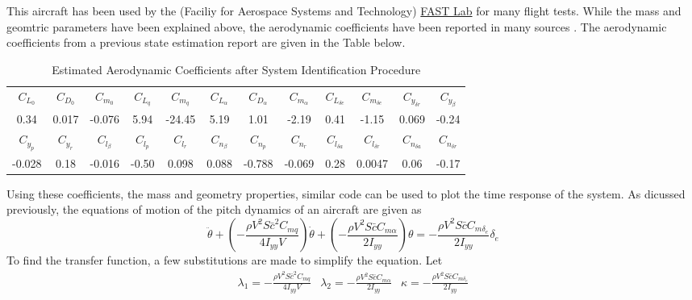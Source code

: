 This aircraft has been used by the (Faciliy for Aerospace Systems and Technology) \href{http://www.aerialsystems.org/}{FAST Lab} for many flight tests. While the mass and geomtric parameters have been explained above, the aerodynamic coefficients have been reported in many sources \cite{Cobar_FASTSim_AVIATION_2022,CobarMeta2019,CobarMASTERS}. The aerodynamic coefficients from a previous state estimation report are given in the Table below\cite{CobarMeta2019}.
\begin{table}[H]
\begin{center}
\caption{Estimated Aerodynamic Coefficients after System
  Identification Procedure}
\begin{tabular}{cccccccccccc}
  \hline
  $C_{L_{0}}$ & $C_{D_{0}}$ & $C_{m_{0}}$ & $C_{L_{q}}$ & $C_{m_{q}}$  & $C_{L_{\alpha}}$ & $C_{D_{\alpha}}$ & $C_{m_{\alpha}}$ &  $C_{L_{{\delta}e}}$  & $C_{m_{{\delta}e}}$ & $C_{y_{{\delta}r}}$ &  $C_{y_{\beta}}$ \\
  0.34       & 0.017     & { -0.076}       &  5.94       &
    -24.45 &  5.19  &  1.01         & { -2.19}        & 0.41 &
  {-1.15} &  0.069 &  -0.24 \\
  \hline
  $C_{y_{p}}$ & $C_{y_{r}}$ & $C_{l_{\beta}}$ &  $C_{l_{p}}$ & $C_{l_{r}}$ &   $C_{n_{\beta}}$ &  $C_{n_{p}}$&  $C_{n_r}$ & $C_{l_{{\delta}a}}$ &  $C_{l_{{\delta}r}}$ &  $C_{n_{{\delta}a}}$ & $C_{n_{{\delta}r}}$ \\
  -0.028    & 0.18      &  -0.016       & {-0.50}    &  0.098   &
  { 0.088}
  & { -0.788}      &  {-0.069}          &  { 0.28} & 0.0047
  & { 0.06} & { -0.17}\\
  \hline
\end{tabular}
\label{t:aerofinal}
\end{center}
\end{table}
\noindent Using these coefficients, the mass and geometry properties, similar code can be used to plot the time response of the system. As dicussed previously, the equations of motion of the pitch dynamics of an aircraft are given as 
\begin{equation}
    \ddot{\theta} + \left(-\frac{\rho V^2 S \bar{c}^2 C_{mq}}{4I_{yy} V}\right)\dot{\theta} + \left(-\frac{\rho V^2 S \bar{c} C_{m\alpha}}{2I_{yy}}\right)\theta = -\frac{\rho V^2 S \bar{c} C_{m\delta_e}}{2I_{yy}}\delta_e
\end{equation}
To find the transfer function, a few substitutions are made to simplify the equation. Let
\begin{equation}
    \begin{matrix}
    \lambda_1 = -\frac{\rho V^2 S \bar{c}^2 C_{mq}}{4I_{yy} V} &
    \lambda_2 = -\frac{\rho V^2 S \bar{c} C_{m\alpha}}{2I_{yy}} &
    \kappa = -\frac{\rho V^2 S \bar{c} C_{m\delta_e}}{2I_{yy}}
\end{matrix}
\end{equation}
